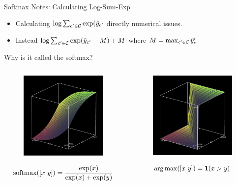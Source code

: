 \documentclass{beamer}
\begin{document}
\begin{frame}{Softmax Notes: Calculating Log-Sum-Exp}
  \begin{itemize}
  \item Calculating $\log \sum_{c' \in \mathcal{C}} \exp(\hat{y}_{c'}$ directly numerical issues.
  \item Instead $\log \sum_{c' \in \mathcal{C}} \exp(\hat{y}_{c'} - M) + M$ where $M = \max_{c'\in\mathcal{C}} \hat{y}_c'$ 
  \end{itemize}
\end{frame}


\begin{frame}{Why is it called the softmax?}

  \begin{columns}[t]
    \begin{column}[t]{0.5\textwidth}


      \begin{figure}
        \centering
        \includegraphics[width=5cm]{softmax}
      \end{figure}
      \[\softmax([x\ y]) = \frac{\exp(x)}{\displaystyle  \exp(x) + \exp(y)}  \]
    \end{column}

    \begin{column}[t]{0.5\textwidth}


      \begin{figure}
        \centering
      \includegraphics[width=5cm]{argmax}
      \end{figure}
      \[\argmax([x\ y]) = \indicator(x > y) \]      
    \end{column}
  \end{columns}
\end{frame}
\end{document}
